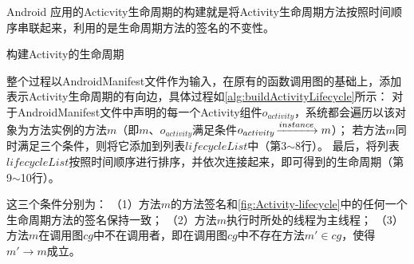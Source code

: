 Android 应用的Acticvity生命周期的构建就是将Activity生命周期方法按照时间顺序串联起来，利用的是生命周期方法的签名的不变性。

\begin{algorithm}[!ht]
	\caption{构建Activity的生命周期} 
	\label{alg:buildActivityLifecycle}
	
	
	
	
	
\end{algorithm}

整个过程以AndroidManifest文件作为输入，在原有的函数调用图的基础上，添加表示Activity生命周期的有向边，具体过程如\autoref{alg:buildActivityLifecycle}所示：
对于AndroidManifest文件中声明的每一个Activity组件$o_{activity}$，系统都会遍历以该对象为方法实例的方法$m$（即$m$、$o_{activity}$满足条件$o_{activity} \joinrel\xrightarrow{instance} m$）；
若方法$m$同时满足三个条件，则将它添加到列表$lifecycleList$中（第3$\sim$8行）。
最后，将列表$lifecycleList$按照时间顺序进行排序，并依次连接起来，即可得到的生命周期（第9$\sim$10行）。

这三个条件分别为：
（1）方法$m$的方法签名和\autoref{fig:Activity-lifecycle}中的任何一个生命周期方法的签名保持一致；
（2）方法$m$执行时所处的线程为主线程；
（3）方法$m$在调用图$cg$中不在调用者，即在调用图$cg$中不存在方法$m' \in cg$，使得$m' \to m $成立。





